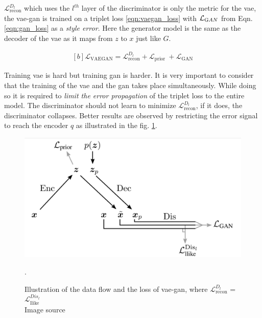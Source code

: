 $\mathcal{L}_{\text {recon}}^{D_{l}}$ which uses the $l^{th}$ layer of the discriminator is only the metric for the \ac{vae}, the \ac{vae}-\ac{gan} is trained on a triplet loss \ref{eqn:vaegan_loss} with $\mathcal{L}_{\text GAN}$ from Eqn. \ref{eqn:gan_loss} as a \textit{style error}. Here the generator model is the same as the decoder of the \ac{vae} as it maps from $z$ to $x$ just like $G$.

\begin{equation} \label{eqn:vaegan_loss}
    \begin{gathered}[b]
    \mathcal{L}_{\mathrm{VAEGAN}} = \mathcal{L}_{\text {recon}}^{D_{l}} +\mathcal{L}_{\text {prior }} + \mathcal{L}_{\text {GAN}}
    \end{gathered}
\end{equation}

Training \ac{vae} is hard but training \ac{gan} is harder. It is very important to consider that the training of the \ac{vae} and the \ac{gan} takes place simultaneously. While doing so it is required to \textit{limit the error propagation} of the triplet loss to the entire model. The discriminator should not learn to minimize $\mathcal{L}_{\text {recon}}^{D_{l}}$, if it does, the discriminator collapses. Better results are observed by restricting the error signal to reach the encoder $q$ as illustrated in the fig. \ref{fig:vaegan_loss_graph}. 

\begin{figure}[h]
    \centering
    \includegraphics[scale=0.25]{figures/arch/vae_gan_loss_graph.png}
    \caption{Illustration of the data flow and the loss of \ac{vae}-\ac{gan}, where $\mathcal{L}_{\text {recon}}^{D_{l}}$ = $\mathcal{L}_{\text {llike}}^{Dis_{l}}$ \\
    Image source \cite{autoencoding_beyond_pixels}}. 
    \label{fig:vaegan_loss_graph}
\end{figure}

